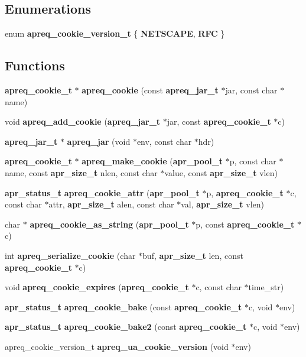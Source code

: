 \subsection*{Enumerations}
\begin{CompactItemize}
\item 
enum {\bf apreq\_\-cookie\_\-version\_\-t} \{ {\bf NETSCAPE}, 
{\bf RFC}
 \}
\end{CompactItemize}
\subsection*{Functions}
\begin{CompactItemize}
\item 
{\bf apreq\_\-cookie\_\-t} $\ast$ {\bf apreq\_\-cookie} (const {\bf apreq\_\-jar\_\-t} $\ast$jar, const char $\ast$name)
\item 
void {\bf apreq\_\-add\_\-cookie} ({\bf apreq\_\-jar\_\-t} $\ast$jar, const {\bf apreq\_\-cookie\_\-t} $\ast$c)
\item 
{\bf apreq\_\-jar\_\-t} $\ast$ {\bf apreq\_\-jar} (void $\ast$env, const char $\ast$hdr)
\item 
{\bf apreq\_\-cookie\_\-t} $\ast$ {\bf apreq\_\-make\_\-cookie} ({\bf apr\_\-pool\_\-t} $\ast$p, const char $\ast$name, const {\bf apr\_\-size\_\-t} nlen, const char $\ast$value, const {\bf apr\_\-size\_\-t} vlen)
\item 
{\bf apr\_\-status\_\-t} {\bf apreq\_\-cookie\_\-attr} ({\bf apr\_\-pool\_\-t} $\ast$p, {\bf apreq\_\-cookie\_\-t} $\ast$c, const char $\ast$attr, {\bf apr\_\-size\_\-t} alen, const char $\ast$val, {\bf apr\_\-size\_\-t} vlen)
\item 
char $\ast$ {\bf apreq\_\-cookie\_\-as\_\-string} ({\bf apr\_\-pool\_\-t} $\ast$p, const {\bf apreq\_\-cookie\_\-t} $\ast$c)
\item 
int {\bf apreq\_\-serialize\_\-cookie} (char $\ast$buf, {\bf apr\_\-size\_\-t} len, const {\bf apreq\_\-cookie\_\-t} $\ast$c)
\item 
void {\bf apreq\_\-cookie\_\-expires} ({\bf apreq\_\-cookie\_\-t} $\ast$c, const char $\ast$time\_\-str)
\item 
{\bf apr\_\-status\_\-t} {\bf apreq\_\-cookie\_\-bake} (const {\bf apreq\_\-cookie\_\-t} $\ast$c, void $\ast$env)
\item 
{\bf apr\_\-status\_\-t} {\bf apreq\_\-cookie\_\-bake2} (const {\bf apreq\_\-cookie\_\-t} $\ast$c, void $\ast$env)
\item 
apreq\_\-cookie\_\-version\_\-t {\bf apreq\_\-ua\_\-cookie\_\-version} (void $\ast$env)\label{group__cookies_a12}

\end{CompactItemize}


